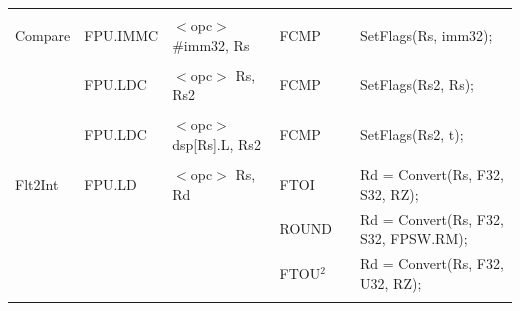 \begin{table}
\begin{subtable}{\linewidth}
\begin{center}
\begin{tabular}{llllll}
                   &                   &                                       &                   &                   &                                                                               \\
Compare            & FPU.IMMC          & $<$opc$>$ \#imm32, Rs                 & FCMP              & \flags{!!!-}      & SetFlags(Rs, imm32);                                                          \\
                   &                   &                                       &                   &                   &                                                                               \\
                   & FPU.LDC           & $<$opc$>$ Rs, Rs2                     & FCMP              & \flags{!!!-}      & SetFlags(Rs2, Rs);                                                            \\
                   &                   &                                       &                   &                   &                                                                               \\
                   & FPU.LDC           & $<$opc$>$ dsp[Rs].L, Rs2              & FCMP              & \flags{!!!-}      & SetFlags(Rs2, t);                                                             \\
                   &                   &                                       &                   &                   &                                                                               \\
Flt2Int            & FPU.LD            & $<$opc$>$ Rs, Rd                      & FTOI              & \flags{-**-}      & Rd = Convert(Rs, F32, S32, RZ);                                               \\
                   &                   &                                       & ROUND             & \flags{-**-}      & Rd = Convert(Rs, F32, S32, FPSW.RM);                                          \\
                   &                   &                                       & FTOU$^2$          & \flags{-**-}      & Rd = Convert(Rs, F32, U32, RZ);                                               \\
                   &                   &                                       &                   &                   &                                                                               \\

\end{tabular}
\end{center}
\end{subtable}
\end{table}
